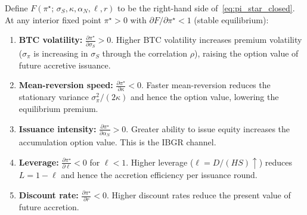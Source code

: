 \begin{proposition}
  \label{prop:comp_statics}
  Define $F(\pi^\star;\,\sigma_S,\kappa,\alpha_N,\ell,r)$ to be the
  right-hand side of~\eqref{eq:pi_star_closed}.  At any interior fixed point
  $\pi^\star > 0$ with $\partial F/\partial \pi^\star < 1$ (stable
  equilibrium):
  \begin{enumerate}
    \item \textbf{BTC volatility:}
      $\displaystyle\frac{\partial \pi^\star}{\partial \sigma_S} > 0.$
      Higher BTC volatility increases premium volatility
      ($\sigma_\pi$ is increasing in $\sigma_S$ through the correlation
      $\rho$), raising the option value of future accretive issuance.

    \item \textbf{Mean-reversion speed:}
      $\displaystyle\frac{\partial \pi^\star}{\partial \kappa} < 0.$
      Faster mean-reversion reduces the stationary variance
      $\sigma_\pi^2/(2\kappa)$ and hence the option value, lowering the
      equilibrium premium.

    \item \textbf{Issuance intensity:}
      $\displaystyle\frac{\partial \pi^\star}{\partial \alpha_N} > 0.$
      Greater ability to issue equity increases the accumulation option value.
      This is the IBGR channel.

    \item \textbf{Leverage:}
      $\displaystyle\frac{\partial \pi^\star}{\partial \ell} < 0$ for
      $\ell < 1.$
      Higher leverage ($\ell = D/(HS) \uparrow$) reduces $L = 1 - \ell$ and
      hence the accretion efficiency per issuance round.

    \item \textbf{Discount rate:}
      $\displaystyle\frac{\partial \pi^\star}{\partial r} < 0.$
      Higher discount rates reduce the present value of future accretion.
  \end{enumerate}
\end{proposition}

